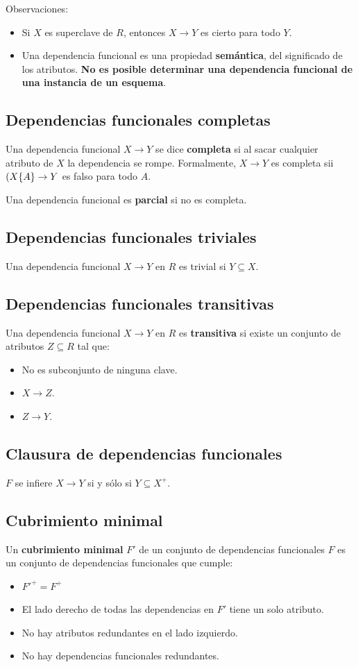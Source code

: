 \documentclass[]{article}
\begin{document}
Observaciones:
\begin{itemize}
    \item Si $X$ es superclave de $R$, entonces $X\rightarrow Y$ es cierto para todo $Y$.
    \item Una dependencia funcional es una propiedad \textbf{semántica}, del significado de los atributos. \textbf{No es posible determinar una dependencia funcional de una instancia de un esquema}.
\end{itemize}

\subsection{Dependencias funcionales completas}
Una dependencia funcional $X\rightarrow Y$ se dice \textbf{completa} si al sacar cualquier atributo de $X$ la dependencia se rompe. Formalmente, $X\rightarrow Y$ es completa sii $(X\\\{A\} \rightarrow Y$ es falso para todo $A$.

Una dependencia funcional es \textbf{parcial} si no es completa.

\subsection{Dependencias funcionales triviales}
Una dependencia funcional $X\rightarrow Y$ en $R$ es trivial si $Y\subseteq X$.

\subsection{Dependencias funcionales transitivas}
Una dependencia funcional $X\rightarrow Y$ en $R$ es \textbf{transitiva} si existe un conjunto de atributos $Z\subseteq R$ tal que:
\begin{itemize}
     \item No es subconjunto de ninguna clave.
     \item $X\rightarrow Z$.
     \item $Z\rightarrow Y$.
 \end{itemize}

\subsection{Clausura de dependencias funcionales}
$F$ se infiere $X\rightarrow Y$ si y sólo si $Y \subseteq X^+$.

\subsection{Cubrimiento minimal}
Un \textbf{cubrimiento minimal} $F'$ de un conjunto de dependencias funcionales $F$ es un conjunto de dependencias funcionales que cumple:
\begin{itemize}
    \item $F'^+ = F^+$
    \item El lado derecho de todas las dependencias en $F'$ tiene un solo atributo.
    \item No hay atributos redundantes en el lado izquierdo.
    \item No hay dependencias funcionales redundantes.
\end{itemize}
\end{document}
